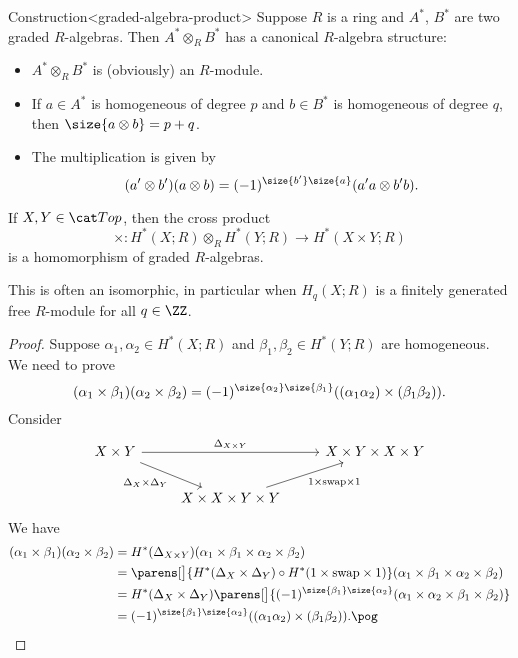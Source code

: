 \documentclass{standalone}
\begin{document}
\begin{adhoctheorem}{Construction}<graded-algebra-product>
  Suppose \(R\) is a ring and \(A^*\), \(B^*\) are two graded \(R\)-algebras.
  Then \(A^* \otimes_R B^*\) has a canonical \(R\)-algebra structure:
  \begin{itemize}[nosep]
    \item \(A^* \otimes_R B^*\) is (obviously) an \(R\)-module.
    \item If \(a \in A^*\) is homogeneous of degree \(p\) and
             \(b \in B^*\) is homogeneous of degree \(q\), then
          \(\size{a \otimes b} = p + q\).
    \item The multiplication is given by
          \[
            (a' \otimes b')(a \otimes b)
              = (-1)^{\size{b'} \size{a}}(a' a \otimes b' b).
          \]
  \end{itemize}
\end{adhoctheorem}

\begin{theorem}
  If \(X, Y \in \cTop\), then the cross product
  \[
    {\times} \colon H^*(X; R) \otimes_R H^*(Y; R) \to H^*(X \times Y; R)
  \]
  is a homomorphism of graded \(R\)-algebras.
\end{theorem}
This is often an isomorphic, in particular when \(H_q(X; R)\) is
a finitely generated free \(R\)-module for all \(q \in \ZZ\).

\begin{proof}
  Suppose \(\alpha_1, \alpha_2 \in H^*(X; R)\) and
          \(\beta_1,  \beta_2  \in H^*(Y; R)\) are homogeneous.
  We need to prove
  \[
    (\alpha_1 \times \beta_1)(\alpha_2 \times \beta_2)
      = (-1)^{\size{\alpha_2} \size{\beta_1}}
        ((\alpha_1 \alpha_2) \times (\beta_1 \beta_2)).
  \]
  Consider
  \[
    \begin{tikzcd}
      X \times Y \ar[rr, "\Delta_{X \times Y}"]
                 \ar[dr, "\Delta_X \times \Delta_Y"'] &&
        X \times Y \times X \times Y \\
      & X \times X \times Y \times Y \ar[ur, "1 \times \text{swap} \times 1"']
    \end{tikzcd}
  \]
  We have
  \begin{align*}
    (\alpha_1 \times \beta_1)(\alpha_2 \times \beta_2)
      &= H^*(\Delta_{X \times Y})
           (\alpha_1 \times \beta_1 \times \alpha_2 \times \beta_2) \\
      &= \parens[\big]{H^*(\Delta_X \times \Delta_Y) \circ
                       H^*(1 \times \text{swap} \times 1)}
           (\alpha_1 \times \beta_1 \times \alpha_2 \times \beta_2) \\
      &= H^*(\Delta_X \times \Delta_Y) \parens[\big]{
           (-1)^{\size{\beta_1} \size{\alpha_2}}
           (\alpha_1 \times \alpha_2 \times \beta_1 \times \beta_2)} \\
      &= (-1)^{\size{\beta_1} \size{\alpha_2}}
           ((\alpha_1 \alpha_2) \times (\beta_1 \beta_2)). \pog
  \end{align*}
\end{proof}
\end{document}
